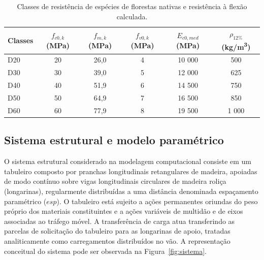\begin{table}[!ht]
\caption{Classes de resistência de espécies de florestas nativas e resistência à flexão calculada.\label{tab:classes_madeira}}
\begin{threeparttable}
\footnotesize
\setlength{\tabcolsep}{3pt}
\begin{tabular*}{\columnwidth}{@{\extracolsep{\fill}}lccccc@{\extracolsep{\fill}}}
\toprule
Classes & $f_{c0,k}$ (MPa) & $f_{m,k}$ (MPa) & $f_{v0,k}$ (MPa) & $E_{c0,med}$ (MPa) & $\rho_{12\%}$ (kg/m\textsuperscript{3}) \\
\midrule
D20 & 20 & 26,0 & 4 & 10 000 & 500 \\
D30 & 30 & 39,0 & 5 & 12 000 & 625 \\
D40 & 40 & 51,9 & 6 & 14 500 & 750 \\
D50 & 50 & 64,9 & 7 & 16 500 & 850 \\
D60 & 60 & 77,9 & 8 & 19 500 & 1 000 \\
\bottomrule
\end{tabular*}
\footnotesize
\end{threeparttable}
\end{table}
\subsection{Sistema estrutural e modelo paramétrico}\label{sec:sistema}

O sistema estrutural considerado na modelagem computacional consiste em um tabuleiro composto por pranchas longitudinais retangulares de madeira, apoiadas de modo contínuo sobre vigas longitudinais circulares de madeira roliça (longarinas), regularmente distribuídas a uma distância denominada espaçamento paramétrico ($esp$).
O tabuleiro está sujeito a ações permanentes oriundas do peso próprio dos materiais constituintes e a ações variáveis de multidão e de eixos associadas ao tráfego móvel.
A transferência de carga atua transferindo as parcelas de solicitação do tabuleiro para as longarinas de apoio, tratadas analiticamente como carregamentos distribuídos no vão.
A representação conceitual do sistema pode ser observada na Figura~\ref{fig:sistema}.

